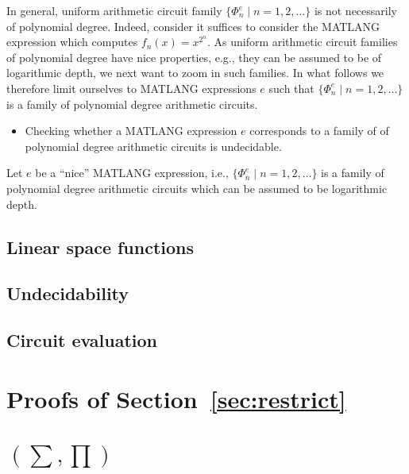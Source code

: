 In general, uniform arithmetic circuit family $\{\Phi_n^e\mid n=1,2,\ldots\}$ is not necessarily of polynomial degree. Indeed, consider it suffices to consider the MATLANG expression which computes
$f_n(x)=x^{2^n}$. 
As uniform arithmetic circuit families of polynomial degree have nice properties, e.g., they can be assumed to be of logarithmic depth, we next want to zoom in such families. In what follows we therefore limit ourselves to MATLANG expressions $e$ such that $\{\Phi_n^e\mid n=1,2,\ldots\}$ is a family of polynomial degree arithmetic circuits.

\begin{itemize}
	\item Checking whether a MATLANG expression $e$ corresponds to a family of of polynomial degree arithmetic circuits is undecidable. 
\end{itemize}

Let $e$ be a ``nice'' MATLANG expression, i.e.,  $\{\Phi_n^e\mid n=1,2,\ldots\}$ is a family of polynomial degree arithmetic circuits which can be assumed to be logarithmic depth. 



\subsection{Linear space functions}


\subsection{Undecidability}


\subsection{Circuit evaluation}


\section{Proofs of Section~\ref{sec:restrict}}


\section{\lang$(\sum,\prod)$}


